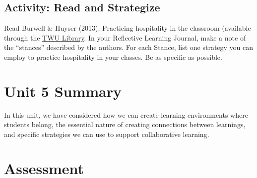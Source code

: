 \documentclass[
]{book}
\begin{document}
\hypertarget{activity-read-and-strategize}{%
\subsection{Activity: Read and Strategize}\label{activity-read-and-strategize}}

\begin{reflect}
Read Burwell \& Huyser (2013). Practicing hospitality in the classroom
(available through the \href{https://www.twu.ca/library}{TWU Library}.
In your Reflective Learning Journal, make a note of the ``stances''
described by the authors. For each Stance, list one strategy you can
employ to practice hospitality in your classes. Be as specific as
possible.
\end{reflect}

\hypertarget{unit-5-summary}{%
\section*{Unit 5 Summary}\label{unit-5-summary}}

In this unit, we have considered how we can create learning environments where students belong, the essential nature of creating connections between learnings, and specific strategies we can use to support collaborative learning.

\hypertarget{assessment-4}{%
\section*{Assessment}\label{assessment-4}}
\end{document}
